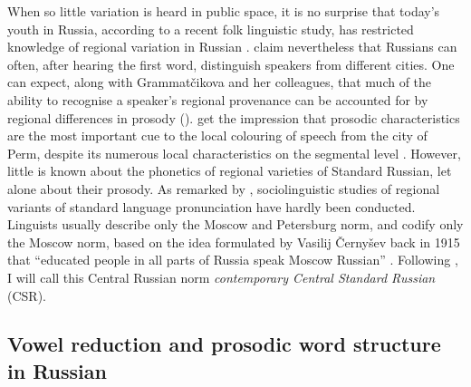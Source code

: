 \documentclass[output=paper]{langscibook}
\begin{document}
When so little variation is heard in public space, it is no surprise that today’s youth in Russia, according to a recent folk linguistic study, has restricted knowledge of regional variation in Russian \citep{Vardøy2021}. \citet[72]{GrammatčikovaPožarickaja2013} claim nevertheless that Russians can often, after hearing the first word, distinguish speakers from different cities. One can expect, along with Grammatčikova and her colleagues, that much of the ability to recognise a speaker’s regional provenance can be accounted for by regional differences in prosody (\citealt{GrammatčikovaPožarickaja2013, Post2017}). \citet{ErofeevaEtAl2000} get the impression that prosodic characteristics are the most important cue to the local colouring of speech from the city of Perm, despite its numerous local characteristics on the segmental level \citep{Erofeeva2005}. However, little is known about the phonetics of regional varieties of Standard Russian, let alone about their prosody. As remarked by \citet{Kalenčuk2021}, sociolinguistic studies of regional variants of standard language pronunciation have hardly been conducted. Linguists usually describe only the Moscow and Petersburg norm, and codify only the Moscow norm, based on the idea formulated by Vasilij Černyšev back in 1915 that ``educated people in all parts of Russia speak Moscow Russian'' \citep[11]{Kalenčuk2021}. Following \citet[522]{Iosad2012}, I will call this Central Russian norm \textit{contemporary Central Standard Russian} (CSR).


\subsection{Vowel reduction and prosodic word structure in Russian}
\label{sec:post:1.2}
\end{document}
